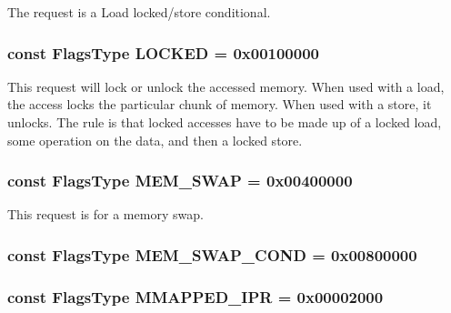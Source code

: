 \label{classRequest_ae940f472047b661a3913d069f9c3bea3}
The request is a Load locked/store conditional. \hypertarget{classRequest_a94c7f94a4d702cb260f87a21f4485e8f}{
\subsubsection[{LOCKED}]{\setlength{\rightskip}{0pt plus 5cm}const {\bf FlagsType} {\bf LOCKED} = 0x00100000}}
\label{classRequest_a94c7f94a4d702cb260f87a21f4485e8f}
This request will lock or unlock the accessed memory. When used with a load, the access locks the particular chunk of memory. When used with a store, it unlocks. The rule is that locked accesses have to be made up of a locked load, some operation on the data, and then a locked store. \hypertarget{classRequest_a121993e008dc808d117858dfafd21ae5}{
\subsubsection[{MEM\_\-SWAP}]{\setlength{\rightskip}{0pt plus 5cm}const {\bf FlagsType} {\bf MEM\_\-SWAP} = 0x00400000}}
\label{classRequest_a121993e008dc808d117858dfafd21ae5}
This request is for a memory swap. \hypertarget{classRequest_a7230a85ab11e7e5f89eddc963161279f}{
\subsubsection[{MEM\_\-SWAP\_\-COND}]{\setlength{\rightskip}{0pt plus 5cm}const {\bf FlagsType} {\bf MEM\_\-SWAP\_\-COND} = 0x00800000}}
\label{classRequest_a7230a85ab11e7e5f89eddc963161279f}
\hypertarget{classRequest_a49ba1ff56158133aba02dce7a13952cb}{
\subsubsection[{MMAPPED\_\-IPR}]{\setlength{\rightskip}{0pt plus 5cm}const {\bf FlagsType} {\bf MMAPPED\_\-IPR} = 0x00002000}}
